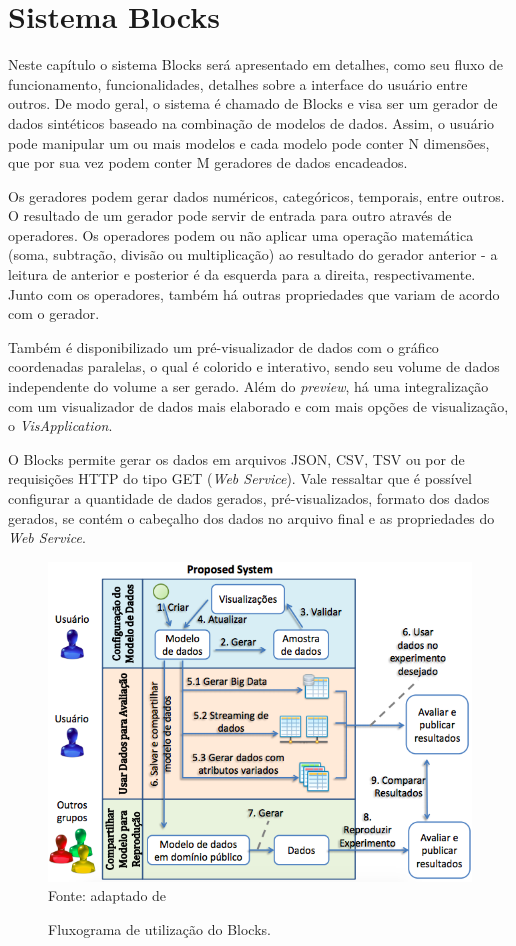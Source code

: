 \documentclass[
	12pt,				%
	openright,			%
	oneside,			%
	a4paper,			%
	english,			%
	brazil				%
	]{abntex2}
\begin{document}
\chapter{Sistema Blocks}
	Neste capítulo o sistema Blocks será apresentado em detalhes, como seu fluxo de funcionamento, funcionalidades, detalhes sobre a interface do usuário entre outros.
	De modo geral, o sistema é chamado de Blocks e visa ser um gerador de dados sintéticos baseado na combinação de modelos de dados.
	Assim, o usuário pode manipular um ou mais modelos e cada modelo pode conter N dimensões, que por sua vez podem conter M geradores de dados encadeados.
	\par
	Os geradores podem gerar dados numéricos, categóricos, temporais, entre outros. 
	O resultado de um gerador pode servir de entrada para outro através de operadores.
	Os operadores podem ou não aplicar uma operação matemática (soma, subtração, divisão ou multiplicação) ao resultado do gerador anterior - a leitura de anterior e posterior é da esquerda para a direita, respectivamente.
	Junto com os operadores, também há outras propriedades que variam de acordo com o gerador.
	\par
	Também é disponibilizado um pré-visualizador de dados com o gráfico coordenadas paralelas, o qual é colorido e interativo, sendo seu volume de dados independente do volume a ser gerado.
	Além do \emph{preview}, há uma integralização com um visualizador de dados mais elaborado e com mais opções de visualização, o \emph{VisApplication}.
	\par
	O Blocks permite gerar os dados em arquivos JSON, CSV, TSV ou por de requisições HTTP do tipo GET (\emph{Web Service}).
	Vale ressaltar que é possível configurar a quantidade de dados gerados, pré-visualizados, formato dos dados gerados, se contém o cabeçalho dos dados no arquivo final e as propriedades do \emph{Web Service}.
	\begin{figure}[h]
		\centering
		\caption{Fluxograma de utilização do Blocks.}
		\includegraphics[width=\linewidth]{./figures/prototipo/fluxogramaUtilizacaoBlocks.png}
		\label{fig:fluxograma}
		\footnotesize Fonte: adaptado de %
	\end{figure}
\end{document}
